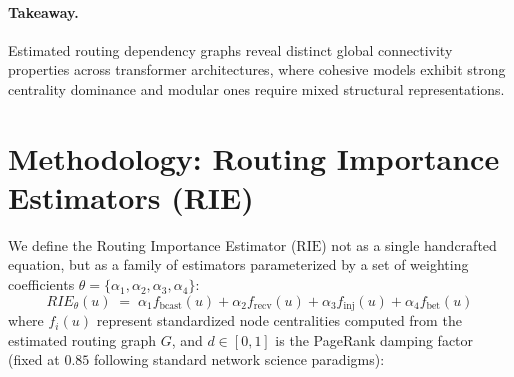 \documentclass[11pt,a4paper]{article}
\newcommand{\rie}{\text{RIE}}
\theoremstyle{definition}
\theoremstyle{plain}
\begin{document}
\paragraph{Takeaway.} Estimated routing dependency graphs reveal distinct global connectivity properties across transformer architectures, where cohesive models exhibit strong centrality dominance and modular ones require mixed structural representations.

\section{Methodology: Routing Importance Estimators (RIE)}
\label{sec:rie}

We define the Routing Importance Estimator ($\rie$) not as a single handcrafted equation, but as a family of estimators parameterized by a set of weighting coefficients $\theta = \{\alpha_1, \alpha_2, \alpha_3, \alpha_4\}$:
\begin{equation}
    RIE_{\theta}(u) \;=\; \alpha_1 f_{\text{bcast}}(u) + \alpha_2 f_{\text{recv}}(u) + \alpha_3 f_{\text{inj}}(u) + \alpha_4 f_{\text{bet}}(u)
    \label{eq:rie_family}
\end{equation}
where $f_i(u)$ represent standardized node centralities computed from the estimated routing graph $G$, and $d \in [0,1]$ is the PageRank damping factor (fixed at $0.85$ following standard network science paradigms):
\end{document}
